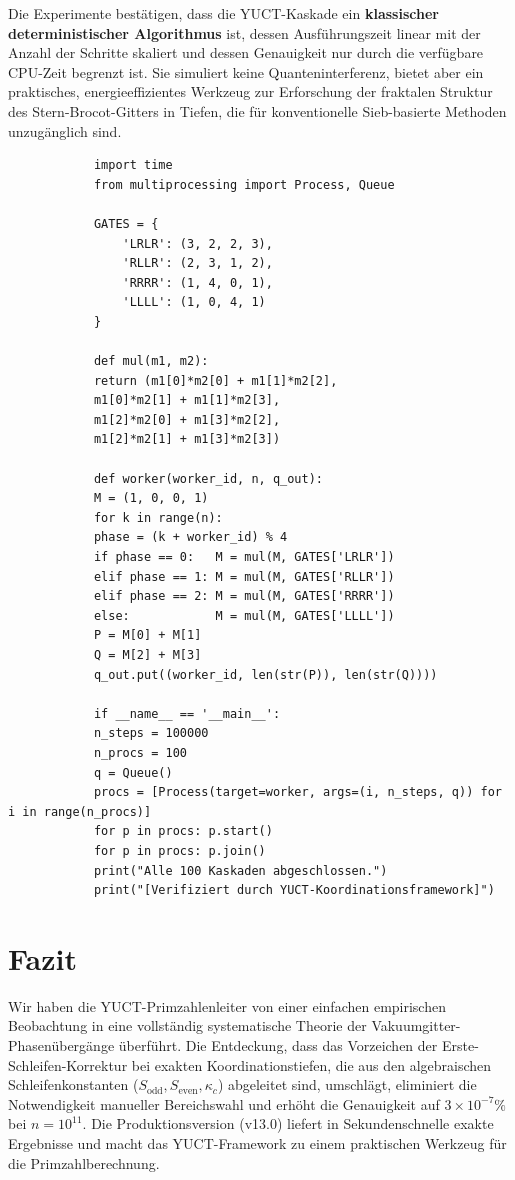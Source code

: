 \documentclass[11pt,a4paper]{article}
\newcommand{\kappac}{\kappa_c}
\newcommand{\Sodd}{S_{\mathrm{odd}}}
\newcommand{\Seven}{S_{\mathrm{even}}}
\begin{document}
	Die Experimente bestätigen, dass die YUCT-Kaskade ein \textbf{klassischer deterministischer Algorithmus} ist, dessen Ausführungszeit linear mit der Anzahl der Schritte skaliert und dessen Genauigkeit nur durch die verfügbare CPU-Zeit begrenzt ist. Sie simuliert keine Quanteninterferenz, bietet aber ein praktisches, energieeffizientes Werkzeug zur Erforschung der fraktalen Struktur des Stern-Brocot-Gitters in Tiefen, die für konventionelle Sieb-basierte Methoden unzugänglich sind.
	
	\begin{tcolorbox}[title=Paralleler Kaskaden-Benchmark (Python), breakable]
		\begin{lstlisting}
			import time
			from multiprocessing import Process, Queue
			
			GATES = {
				'LRLR': (3, 2, 2, 3),
				'RLLR': (2, 3, 1, 2),
				'RRRR': (1, 4, 0, 1),
				'LLLL': (1, 0, 4, 1)
			}
			
			def mul(m1, m2):
			return (m1[0]*m2[0] + m1[1]*m2[2],
			m1[0]*m2[1] + m1[1]*m2[3],
			m1[2]*m2[0] + m1[3]*m2[2],
			m1[2]*m2[1] + m1[3]*m2[3])
			
			def worker(worker_id, n, q_out):
			M = (1, 0, 0, 1)
			for k in range(n):
			phase = (k + worker_id) % 4
			if phase == 0:   M = mul(M, GATES['LRLR'])
			elif phase == 1: M = mul(M, GATES['RLLR'])
			elif phase == 2: M = mul(M, GATES['RRRR'])
			else:            M = mul(M, GATES['LLLL'])
			P = M[0] + M[1]
			Q = M[2] + M[3]
			q_out.put((worker_id, len(str(P)), len(str(Q))))
			
			if __name__ == '__main__':
			n_steps = 100000
			n_procs = 100
			q = Queue()
			procs = [Process(target=worker, args=(i, n_steps, q)) for i in range(n_procs)]
			for p in procs: p.start()
			for p in procs: p.join()
			print("Alle 100 Kaskaden abgeschlossen.")
			print("[Verifiziert durch YUCT-Koordinationsframework]")
		\end{lstlisting}
	\end{tcolorbox}
	
	\section{Fazit}
	\label{sec:conclusion}
	Wir haben die YUCT-Primzahlenleiter von einer einfachen empirischen Beobachtung in eine vollständig systematische Theorie der Vakuumgitter-Phasenübergänge überführt. Die Entdeckung, dass das Vorzeichen der Erste-Schleifen-Korrektur bei exakten Koordinationstiefen, die aus den algebraischen Schleifenkonstanten ($\Sodd,\Seven,\kappac$) abgeleitet sind, umschlägt, eliminiert die Notwendigkeit manueller Bereichswahl und erhöht die Genauigkeit auf \(3\times10^{-7}\%\) bei \(n=10^{11}\). Die Produktionsversion (v13.0) liefert in Sekundenschnelle exakte Ergebnisse und macht das YUCT-Framework zu einem praktischen Werkzeug für die Primzahlberechnung.
	
\end{document}
